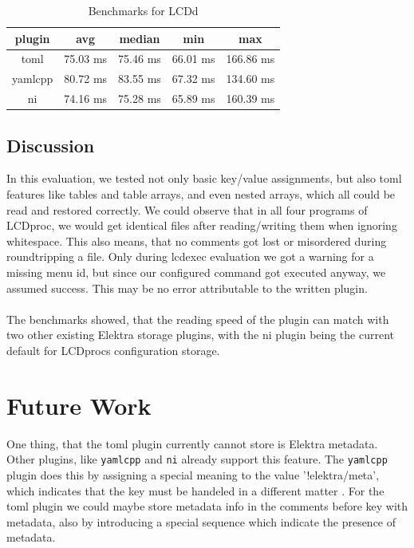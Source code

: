 \documentclass[draft,final]{vutinfth} %
\begin{document}
\FloatBarrier
\begin{table}[!ht]
	\centering
	\begin{tabular}{ccccc}
	\toprule
	plugin & avg & median & min & max \\
	\midrule
	toml 	& 75.03 ms	& 75.46 ms	& 66.01 ms	& 166.86 ms \\
	yamlcpp & 80.72 ms	& 83.55 ms	& 67.32 ms	& 134.60 ms \\
	ni		& 74.16 ms	& 75.28 ms	& 65.89 ms	& 160.39 ms \\
	\bottomrule
	\end{tabular}
	\caption{Benchmarks for LCDd}
	\label{tab:benchmarks}
\end{table}
\FloatBarrier

\section{Discussion}
In this evaluation, we tested not only basic key/value assignments, but also \acrshort{toml} features like tables and table arrays, and even nested arrays, which all could be read and restored correctly.
We could observe that in all four programs of LCDproc, we would get identical files after reading/writing them when ignoring whitespace.
This also means, that no comments got lost or misordered during roundtripping a file.
Only during lcdexec evaluation we got a warning for a missing menu id, but since our configured command got executed anyway, we assumed success. This may be no error attributable to the written plugin.
\\\\
The benchmarks showed, that the reading speed of the plugin can match with two other existing Elektra storage plugins, with the ni plugin being the current default for LCDprocs configuration storage.

\chapter{Future Work}
One thing, that the \acrshort{toml} plugin currently cannot store is Elektra metadata. Other plugins, like \texttt{yamlcpp} and \texttt{ni} already support this feature.
The \texttt{yamlcpp} plugin does this by assigning a special meaning to the value '!elektra/meta', which indicates that the key must be handeled in a different matter \cite{elektrayamlcpp}.
For the \acrshort{toml} plugin we could maybe store metadata info in the comments before key with metadata, also by introducing a special sequence which indicate the presence of metadata.
\end{document}
